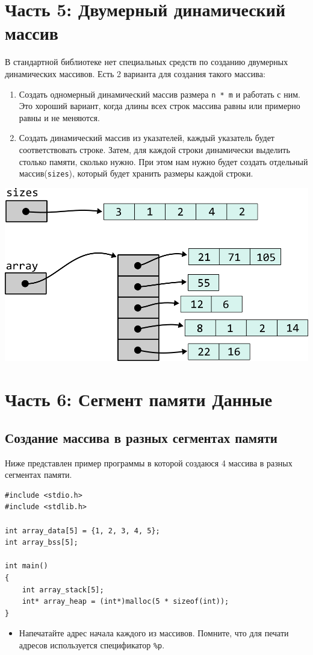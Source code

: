 \documentclass{article}
\begin{document}
\section*{Часть 5: Двумерный динамический массив}
В стандартной библиотеке нет специальных средств по созданию
двумерных динамических массивов. Есть 2 варианта для создания
такого массива:
\begin{enumerate}
\item Создать одномерный динамический массив размера \texttt{n * m} и работать с ним.
Это хороший вариант, когда длины всех строк массива равны или примерно равны и не меняются.
\item Создать динамический массив из указателей, каждый указатель будет 
соответствовать строке. Затем, для каждой строки динамически выделить столько памяти,
сколько нужно. При этом нам нужно будет создать отдельный массив(\texttt{sizes}), который будет хранить
размеры каждой строки.
\end{enumerate}
\begin{center}
\includegraphics[scale=1]{../images/pointer_schemes/two_dim_dynamic_array.png}
\end{center}

\newpage
\section*{Часть 6: Сегмент памяти Данные}
\subsection*{Создание массива в разных сегментах памяти}
Ниже представлен пример программы в которой создаюся 4 массива в разных сегментах памяти.
\begin{lstlisting}
#include <stdio.h>
#include <stdlib.h>

int array_data[5] = {1, 2, 3, 4, 5};
int array_bss[5];

int main() 
{
    int array_stack[5];
    int* array_heap = (int*)malloc(5 * sizeof(int));
}
\end{lstlisting}
\begin{itemize}
\item Напечатайте адрес начала каждого из массивов. Помните, что для печати адресов используется спецификатор \texttt{\%p}.
\end{itemize}
\end{document}
